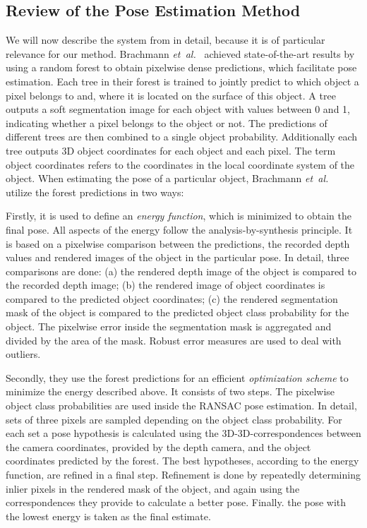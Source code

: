 \documentclass[10pt,letterpaper]{article}
\newcommand{\etal}{\mbox{\emph{et al.\ }}}
\begin{document}
\subsection{Review of the Pose Estimation Method \cite{brachmann2014} \label{sec:brachmann}}
We will now describe the system from \cite{brachmann2014} in detail, because it is of particular relevance for our method. Brachmann \etal \cite{brachmann2014} achieved state-of-the-art results by using a random forest \cite{breiman_2001} to obtain pixelwise dense predictions, which facilitate pose estimation. Each tree in their forest is trained to jointly predict to which object a pixel belongs to and, where it is located on the surface of this object. A tree outputs a soft segmentation image for each object with values between 0 and 1, indicating whether a pixel belongs to the object or not. The predictions of different trees are then combined to a single object probability. Additionally each tree outputs 3D object coordinates for each object and each pixel. The term object coordinates refers to the coordinates in the local coordinate system of the object. When estimating the pose of a particular object, Brachmann \etal \cite{brachmann2014} utilize the forest predictions in two ways:

Firstly, it is used to define an {\em energy function}, which is minimized to obtain the final pose. All aspects of the energy follow the analysis-by-synthesis principle. It is based on a pixelwise comparison between the predictions, the recorded depth values and rendered images of the object in the particular pose. In detail, three comparisons are done: (a) the rendered depth image of the object is compared to the recorded depth image; (b) the rendered image of object coordinates is compared to the predicted object coordinates; (c) the rendered segmentation mask of the object is compared to the predicted object class probability for the object. The pixelwise error inside the segmentation mask is aggregated and divided by the area of the mask. Robust error measures are used to deal with outliers.

Secondly, they use the forest predictions for an efficient {\em optimization scheme} to minimize the energy described above. It consists of two steps. The pixelwise object class probabilities are used inside the RANSAC pose estimation. In detail, sets of three pixels are sampled depending on the object class probability. For each set a pose hypothesis is calculated using the 3D-3D-correspondences between the camera coordinates, provided by the depth camera, and the object coordinates predicted by the forest. The best hypotheses, according to the energy function, are refined in a final step. Refinement is done by repeatedly determining inlier pixels in the rendered mask of the object, and again using the correspondences they provide to calculate a better pose. Finally. the pose with the lowest energy is taken as the final estimate.
\end{document}
